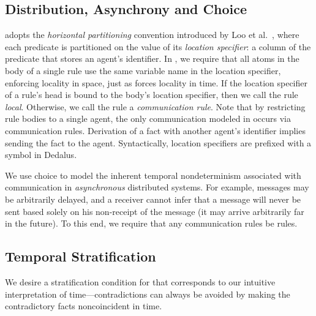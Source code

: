 


\subsection{Distribution, Asynchrony and Choice}

\lang adopts the {\em horizontal partitioning} convention introduced by Loo et
al.~\cite{Loo:2005}, where each predicate is partitioned on the value of its
{\em location specifier}: a column of the predicate that stores an agent's
identifier.  In \lang, we require that all atoms in the body of a single rule
use the same variable name in the location specifier, enforcing locality in
space, just as \lang forces locality in time.  If the location specifier of a
rule's head is bound to the body's location specifier, then we call the rule
{\em local}.  Otherwise, we call the rule a {\em communication rule}.  Note
that by restricting rule bodies to a single agent, the only communication
modeled in \lang occurs via communication rules.  Derivation of a fact with
another agent's identifier implies sending the fact to the agent.
Syntactically, location specifiers are prefixed with a \dedalus{\#} symbol in
Dedalus.

We use choice to model the inherent temporal nondeterminism associated with
communication in {\em asynchronous} distributed systems.  For example, messages
may be arbitrarily delayed, and a receiver cannot infer that a message will
never be sent based solely on his non-receipt of the message (it may arrive
arbitrarily far in the future).  To this end, we require that any communication
rules be  rules.  

\subsection{Temporal Stratification}

We desire a stratification condition for \lang that corresponds to our
intuitive interpretation of time---contradictions can always be avoided by
making the contradictory facts noncoincident in time. 

